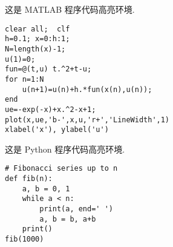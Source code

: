 \documentclass[11pt]{article}
\numberwithin{equation}{section}
\begin{document}
\medskip
\noindent 这是 MATLAB 程序代码高亮环境.

\begin{lstlisting}[style=Matlab,basicstyle=\footnotesize\fontspec{Courier New},title={MATLAB code}]
% Euler method for the ODEs
clear all;  clf
h=0.1; x=0:h:1;
N=length(x)-1;
u(1)=0;
fun=@(t,u) t.^2+t-u;
for n=1:N
    u(n+1)=u(n)+h.*fun(x(n),u(n));
end
ue=-exp(-x)+x.^2-x+1;
plot(x,ue,'b-',x,u,'r+','LineWidth',1)
xlabel('x'), ylabel('u')
\end{lstlisting}

\medskip
\noindent 这是 Python 程序代码高亮环境.

\begin{lstlisting}[style=python,basicstyle=\footnotesize\fontspec{Consolas},title={Python code}]
# Fibonacci series up to n
def fib(n):
    a, b = 0, 1
    while a < n:
        print(a, end=' ')
        a, b = b, a+b
    print()
fib(1000)
\end{lstlisting}
\end{document}
